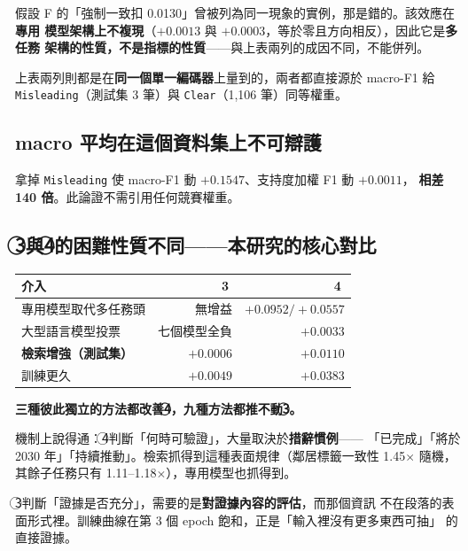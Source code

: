 \documentclass[11pt,a4paper]{ctexart}
\newcommand{\fn}[1]{\texttt{#1}}
\begin{document}
\begin{tcolorbox}[colback=red!5, colframe=red!50, title=強制階層一致不能算第三個實例]
假設 F 的「強制一致扣 0.0130」曾被列為同一現象的實例，那是錯的。該效應在\textbf{專用
模型架構上不複現}（$+0.0013$ 與 $+0.0003$，等於零且方向相反），因此它是\textbf{多任務
架構的性質，不是指標的性質}——與上表兩列的成因不同，不能併列。

\medskip
上表兩列則都是在\textbf{同一個單一編碼器}上量到的，兩者都直接源於 macro-F1 給
\fn{Misleading}（測試集 3 筆）與 \fn{Clear}（1{,}106 筆）同等權重。
\end{tcolorbox}

\subsection{macro 平均在這個資料集上不可辯護}

拿掉 \fn{Misleading} 使 macro-F1 動 $+0.1547$、支持度加權 F1 動 $+0.0011$，
\textbf{相差 140 倍}。此論證不需引用任何競賽權重。

\subsection{\textcircled{3}與\textcircled{4}的困難性質不同——本研究的核心對比}

\begin{table}[h]
\centering\small
\begin{tabular}{@{}lrr@{}}
\toprule
介入 & \textcircled{3} & \textcircled{4} \\
\midrule
專用模型取代多任務頭 & 無增益 & $\mathbf{+0.0952 / +0.0557}$ \\
大型語言模型投票 & 七個模型全負 & $+0.0033$ \\
\textbf{檢索增強（測試集）} & $\mathbf{+0.0006}$ & $\mathbf{+0.0110}$ \\
訓練更久 & $+0.0049$ & $+0.0383$ \\
\bottomrule
\end{tabular}
\end{table}

\textbf{三種彼此獨立的方法都改善\textcircled{4}，九種方法都推不動\textcircled{3}。}

機制上說得通：\textcircled{4}判斷「何時可驗證」，大量取決於\textbf{措辭慣例}——
「已完成」「將於 2030 年」「持續推動」。檢索抓得到這種表面規律（鄰居標籤一致性
1.45$\times$ 隨機，其餘子任務只有 1.11--1.18$\times$），專用模型也抓得到。

\textcircled{3}判斷「證據是否充分」，需要的是\textbf{對證據內容的評估}，而那個資訊
不在段落的表面形式裡。訓練曲線在第 3 個 epoch 飽和，正是「輸入裡沒有更多東西可抽」
的直接證據。
\end{document}
